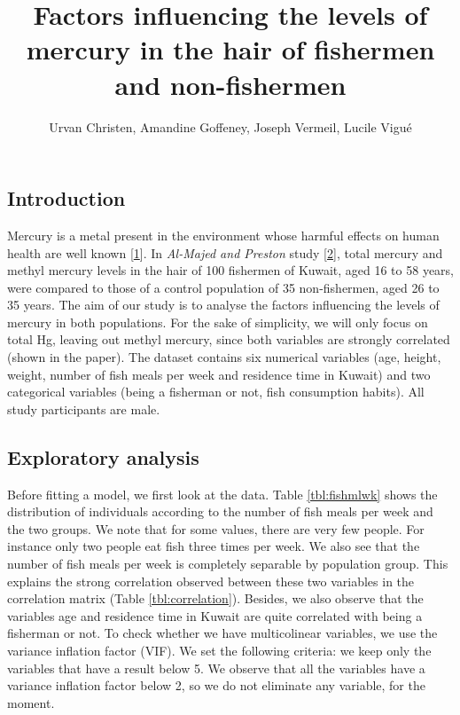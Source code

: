 \documentclass[12pt,]{article}
\title{Factors influencing the levels of mercury in the hair of fishermen and
non-fishermen}
\author{Urvan Christen, Amandine Goffeney, Joseph Vermeil, Lucile Vigué}
\date{}
\begin{document}
\maketitle

\subsection{Introduction}\label{introduction}

Mercury is a metal present in the environment whose harmful effects on
human health are well known
{[}\protect\hyperlink{ref-park2012human}{1}{]}. In \emph{Al-Majed and
Preston} study {[}\protect\hyperlink{ref-al2000factors}{2}{]}, total
mercury and methyl mercury levels in the hair of 100 fishermen of
Kuwait, aged 16 to 58 years, were compared to those of a control
population of 35 non-fishermen, aged 26 to 35 years. The aim of our
study is to analyse the factors influencing the levels of mercury in
both populations. For the sake of simplicity, we will only focus on
total Hg, leaving out methyl mercury, since both variables are strongly
correlated (shown in the paper). The dataset contains six numerical
variables (age, height, weight, number of fish meals per week and
residence time in Kuwait) and two categorical variables (being a
fisherman or not, fish consumption habits). All study participants are
male.

\subsection{Exploratory analysis}\label{exploratory-analysis}

Before fitting a model, we first look at the data. Table
\ref{tbl:fishmlwk} shows the distribution of individuals according to
the number of fish meals per week and the two groups. We note that for
some values, there are very few people. For instance only two people eat
fish three times per week. We also see that the number of fish meals per
week is completely separable by population group. This explains the
strong correlation observed between these two variables in the
correlation matrix (Table \ref{tbl:correlation}). Besides, we also
observe that the variables age and residence time in Kuwait are quite
correlated with being a fisherman or not. To check whether we have
multicolinear variables, we use the variance inflation factor (VIF). We
set the following criteria: we keep only the variables that have a
result below 5. We observe that all the variables have a variance
inflation factor below 2, so we do not eliminate any variable, for the
moment.
\end{document}
